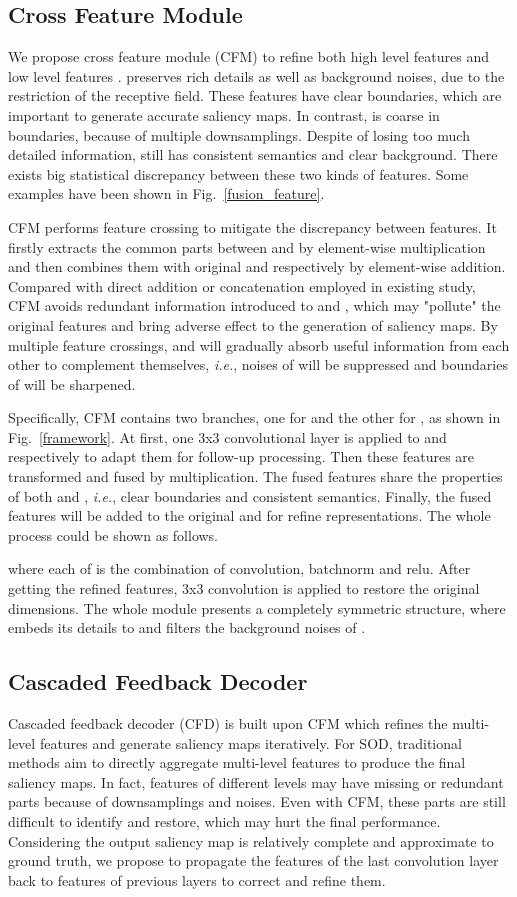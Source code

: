 \documentclass[letterpaper]{article} \usepackage{aaai20}  \usepackage{times}  \usepackage{helvet} \usepackage{courier}  \usepackage[hyphens]{url}  \usepackage{graphicx} \urlstyle{rm} \def\UrlFont{\rm}  \usepackage{graphicx}  \frenchspacing  \setlength{\pdfpagewidth}{8.5in}  \setlength{\pdfpageheight}{11in}
\begin{document}
\subsection{Cross Feature Module}
We propose cross feature module (CFM) to refine both high level features  and low level features .  preserves rich details as well as background noises, due to the restriction of the receptive field. These features have clear boundaries, which are important to generate accurate saliency maps. In contrast,  is coarse in boundaries, because of multiple downsamplings. Despite of losing too much detailed information,  still has consistent semantics and clear background. There exists big statistical discrepancy between these two kinds of features. Some examples have been shown in Fig.~\ref{fusion_feature}. 

CFM performs feature crossing to mitigate the discrepancy between features. It firstly extracts the common parts between  and  by element-wise multiplication and then combines them with original  and  respectively by element-wise addition. Compared with direct addition or concatenation employed in existing study, CFM avoids redundant information introduced to  and , which may "pollute" the original features and bring adverse effect to the generation of saliency maps. By multiple feature crossings,  and  will gradually absorb useful information from each other to complement themselves, {\it i.e.}, noises of  will be suppressed and boundaries of  will be sharpened.

Specifically, CFM contains two branches, one for  and the other for , as shown in Fig.~\ref{framework}. At first, one 3x3 convolutional layer is applied to  and  respectively to adapt them for follow-up processing. Then these features are transformed and fused by multiplication. The fused features share the properties of both  and , {\it i.e.}, clear boundaries and consistent semantics. Finally, the fused features will be added to the original  and  for refine representations. The whole process could be shown as follows.

where each of  is the combination of convolution, batchnorm and relu. After getting the refined features, 3x3 convolution is applied to restore the original dimensions. The whole module presents a completely symmetric structure, where  embeds its details to  and  filters the background noises of .

\subsection{Cascaded Feedback Decoder}
Cascaded feedback decoder (CFD) is built upon CFM which refines the multi-level features and generate saliency maps iteratively. For SOD, traditional methods aim to directly aggregate multi-level features to produce the final saliency maps. In fact, features of different levels may have missing or redundant parts because of downsamplings and noises. Even with CFM, these parts are still difficult to identify and restore, which may hurt the final performance. Considering the output saliency map is relatively complete and approximate to ground truth, we propose to propagate the features of the last convolution layer back to features of previous layers to correct and refine them.
\end{document}
